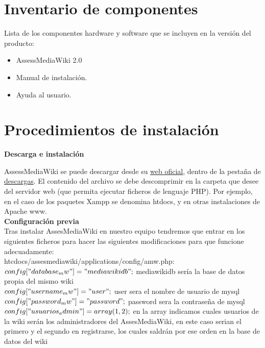 \section{Inventario de componentes}
Lista de los componentes hardware y software que se incluyen en la versión del producto:
\begin{itemize}
	\item AssessMediaWiki 2.0
	\item Manual de instalación.
	\item Ayuda al usuario.
\end{itemize}

\section{Procedimientos de instalación}
\textbf{Descarga e instalación}

AssessMediaWiki se puede descargar desde su \href{https://forja.rediris.es/projects/assessmediawiki/}{web oficial}, dentro de la pestaña de \href{http://forja.rediris.es/frs/?group_id=1135/}{descargas}. El contenido del archivo se debe descomprimir en la carpeta que desee del servidor web (que permita ejecutar ficheros de lenguaje PHP). Por ejemplo, en el caso de los paquetes Xampp se denomina htdocs, y en otras instalaciones de Apache www.\\


\textbf{Configuración previa}\\

Tras instalar AssesMediaWiki en nuestro equipo tendremos que entrar en los siguientes ficheros para hacer las siguientes modificaciones para que funcione adecuadamente:\\

htcdocs/assesmediawiki/applications/config/amw.php:\\

$config["database_mw"] = "mediawikidb";$ mediawikidb sería la base de datos propia del mismo wiki\\

$config["username_mw"] = "user";$ user sera el nombre de usuario de mysql\\

$config["password_mw"] = "password";$ password sera la contraseña de mysql\\

$config["usuarios_admin"] = array(1, 2);$ en la array indicamos cuales usuarios de la wiki serán los administradores del AssesMediaWiki, en este caso serian el primero y el segundo en registrarse, los cuales saldrán por ese orden en la base de datos del wiki\\


